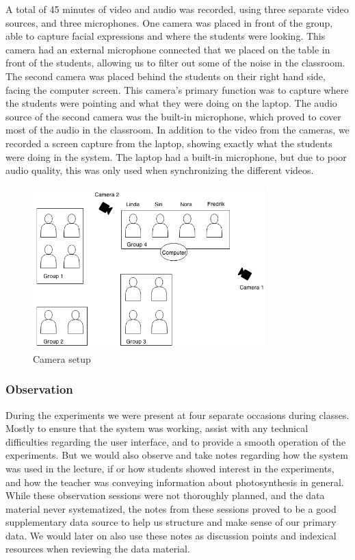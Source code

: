 A total of 45 minutes of video and audio was recorded, using three separate video sources, and three microphones. One camera was placed in front of the group, able to capture facial expressions and where the students were looking. This camera had an external microphone connected that we placed on the table in front of the students, allowing us to filter out some of the noise in the classroom. The second camera was placed behind the students on their right hand side, facing the computer screen. This camera's primary function was to capture where the students were pointing and what they were doing on the laptop. The audio source of the second camera was the built-in microphone, which proved to cover most of the audio in the classroom. In addition to the video from the cameras, we recorded a screen capture from the laptop, showing exactly what the students were doing in the system. The laptop had a built-in microphone, but due to poor audio quality, this was only used when synchronizing the different videos.
\begin{figure}
\centering
\includegraphics[width=0.8\textwidth]{img/empiricalsetting/class_diagram.png}
\caption{Camera setup}
\label{fig:camerasetup}
\end{figure}

\subsubsection{Observation}
During the experiments we were present at four separate occasions during classes. Mostly to ensure that the system was working, assist with any technical difficulties regarding the user interface, and to provide a smooth operation of the experiments. But we would also observe and take notes regarding how the system was used in the lecture, if or how students showed interest in the experiments, and how the teacher was conveying information about photosynthesis in general. While these observation sessions were not thoroughly planned, and the data material never systematized, the notes from these sessions proved to be a good supplementary data source to help us structure and make sense of our primary data. We would later on also use these notes as discussion points and indexical resources when reviewing the data material. 

